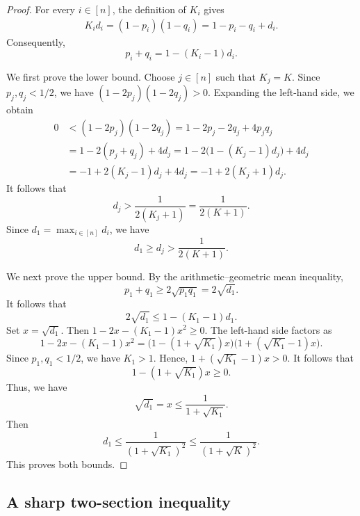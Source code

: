 \documentclass[11pt]{article}
\numberwithin{equation}{section}
\theoremstyle{definition}
\theoremstyle{remark}
\begin{document}
\begin{proof}
For every $i\in[n]$, the definition of $K_i$ gives
\begin{align*}
 K_id_i=
 (1-p_i)(1-q_i)=
 1-p_i-q_i+d_i.
\end{align*}
Consequently,
$$
 p_i+q_i=1-(K_i-1)d_i.
 $$

We first prove the lower bound. Choose $j\in[n]$ such that
$K_j=K$. Since $p_j,q_j<1/2$, we have
$
 (1-2p_j)(1-2q_j)>0.
$
Expanding the left-hand side, we obtain
\begin{align*}
 0
 &<
 (1-2p_j)(1-2q_j)=
 1-2p_j-2q_j+4p_jq_j\\
 &=
 1-2(p_j+q_j)+4d_j=
 1-2\bigl(1-(K_j-1)d_j\bigr)+4d_j\\
 &=
 -1+2(K_j-1)d_j+4d_j=
 -1+2(K_j+1)d_j.
\end{align*}
It follows that
\begin{equation*}
 d_j>\frac{1}{2(K_j+1)}
     =\frac{1}{2(K+1)}.
\end{equation*}
Since $d_1=\max_{i\in[n]}d_i$, we have $$d_1\geq d_j>\frac{1}{2(K+1)}.$$


We next prove the upper bound. By the arithmetic--geometric mean
inequality,
\begin{equation*}
 p_1+q_1\geq2\sqrt{p_1q_1}=2\sqrt{d_1}.
\end{equation*}
It follows that
\begin{equation*}
 2\sqrt{d_1}
 \leq
 1-(K_1-1)d_1.
\end{equation*}
Set $x=\sqrt{d_1}$. Then
$
 1-2x-(K_1-1)x^2\geq0.
$
The left-hand side factors as
\begin{equation*}
 1-2x-(K_1-1)x^2
 =
 \bigl(1-(1+\sqrt{K_1})x\bigr)
 \bigl(1+(\sqrt{K_1}-1)x\bigr).
\end{equation*}
Since $p_1,q_1<1/2$, we have $K_1>1$. Hence,
$
 1+(\sqrt{K_1}-1)x>0.
$
It follows that
\begin{equation*}
 1-(1+\sqrt{K_1})x\geq0.
\end{equation*}
Thus, we have
\begin{equation*}
 \sqrt{d_1}=x\leq\frac{1}{1+\sqrt{K_1}}.
\end{equation*}
Then
\begin{equation*}
 d_1\leq\frac{1}{(1+\sqrt{K_1})^2} \leq
 \frac{1}{(1+\sqrt K)^2}.
\end{equation*}
This proves both bounds.
\end{proof}


\subsection{A sharp two-section inequality}\label{sec:bellman}
\end{document}
